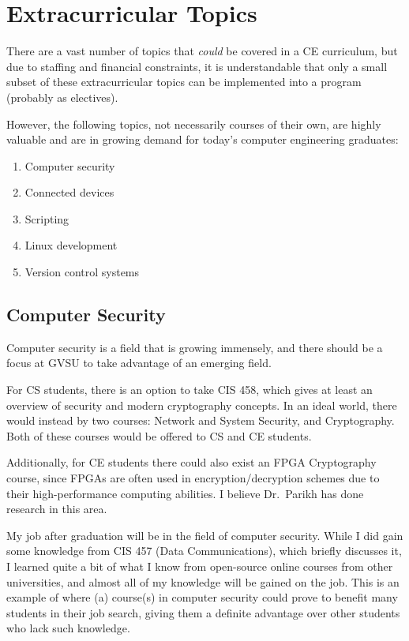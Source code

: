 \documentclass[12pt]{article}
\numberwithin{figure}{section}
\numberwithin{equation}{section}
\begin{document}
{\newpage
\section{Extracurricular Topics}\label{extracurricular}
There are a vast number of topics that \emph{could} be covered in a CE
curriculum, but due to staffing and financial constraints, it is
understandable that only a small subset of these extracurricular topics
can be implemented into a program (probably as electives).

\bigskip

However, the following topics, not necessarily courses of their own, are
highly valuable and are in growing demand for today's computer
engineering graduates:

\begin{enumerate}
\itemsep1pt\parskip0pt
\item Computer security
\item Connected devices
\item Scripting
\item Linux development
\item Version control systems
\end{enumerate}

\subsection{Computer Security}\label{computer-security}
Computer security is a field that is growing immensely, and there should
be a focus at GVSU to take advantage of an emerging field.

\bigskip

For CS students, there is an option to take CIS 458, which gives at
least an overview of security and modern cryptography concepts. In an
ideal world, there would instead by two courses: Network and System
Security, and Cryptography. Both of these courses would be offered to CS
and CE students.

\bigskip

Additionally, for CE students there could also exist an FPGA
Cryptography course, since FPGAs are often used in encryption/decryption
schemes due to their high-performance computing abilities. I believe
Dr.~Parikh has done research in this area.

\bigskip

My job after graduation will be in the field of computer security. While
I did gain some knowledge from CIS 457 (Data Communications), which
briefly discusses it, I learned quite a bit of what I know from
open-source online courses from other universities, and almost all of my
knowledge will be gained on the job. This is an example of where (a)
course(s) in computer security could prove to benefit many students in
their job search, giving them a definite advantage over other students
who lack such knowledge.

}
\end{document}
